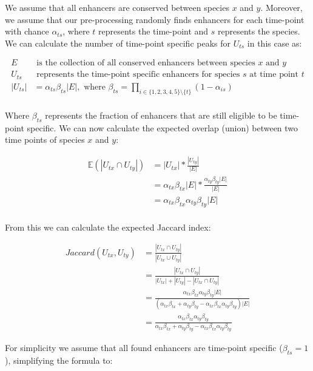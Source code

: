 We assume that all enhancers are conserved between species $x$ and $y$. Moreover, we assume that our pre-processing randomly finds enhancers for each time-point with chance $\alpha_{ts}$, where $t$ represents the time-point and $s$ represents the species. We can calculate the number of time-point specific peaks for $U_{ts}$ in this case as:

\begin{align*}
    E & \text{ is the collection of all conserved enhancers between species } x \text{ and } y \\
    U_{ts} & \text{ represents the time-point specific enhancers for species } s \text{ at time point } t \\
    |U_{ts}| & = \alpha_{ts} \beta_{ts} |E|, \text{ where } \beta_{ts} = \prod_{i \in \{1, 2, 3, 4, 5\}\setminus\{t\}} (1 - \alpha_{is}) \\
\end{align*}

Where $\beta_{ts}$ represents the fraction of enhancers that are still eligible to be time-point specific. We can now calculate the expected overlap (union) between two time points of species $x$ and $y$:

\begin{align*}
    \mathbb{E}(|U_{tx} \cap U_{ty}|) & = |U_{tx}| * \frac{|U_{ty}|}{|E|} \\
    & = \alpha_{tx} \beta_{tx} |E| * \frac{\alpha_{ty} \beta_{ty} |E|}{|E|} \\
    & = \alpha_{tx} \beta_{tx} \alpha_{ty} \beta_{ty} |E| \\
\end{align*}

From this we can calculate the expected Jaccard index:

\begin{align*}
    Jaccard(U_{tx}, U_{ty}) & = \frac{|U_{tx} \cap U_{ty}|}{|U_{tx} \cup U_{ty}|} \\
    & = \frac{|U_{tx} \cap U_{ty}|}{|U_{tx}| + |U_{ty}| - |U_{tx} \cap U_{ty}|} \\
    & = \frac{\alpha_{tx} \beta_{tx} \alpha_{ty} \beta_{ty} |E|}{(\alpha_{tx} \beta_{tx} + \alpha_{ty} \beta_{ty} - \alpha_{tx} \beta_{tx} \alpha_{ty} \beta_{ty})|E|} \\
    & = \frac{\alpha_{tx} \beta_{tx} \alpha_{ty} \beta_{ty}}{\alpha_{tx} \beta_{tx} + \alpha_{ty} \beta_{ty} - \alpha_{tx} \beta_{tx} \alpha_{ty} \beta_{ty}}
\end{align*}

For simplicity we assume that all found enhancers are time-point specific ($\beta_{ts} = 1$), simplifying the formula to:

